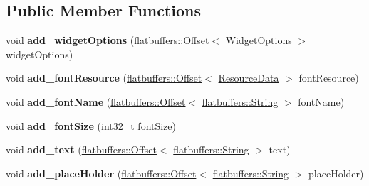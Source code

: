 \subsection*{Public Member Functions}
\begin{DoxyCompactItemize}
\item 
\mbox{\label{structflatbuffers_1_1TextFieldOptionsBuilder_aa5790c3f840f0457cc9e5c38afb6cde7}} 
void {\bfseries add\+\_\+widget\+Options} (\hyperlink{structflatbuffers_1_1Offset}{flatbuffers\+::\+Offset}$<$ \hyperlink{structflatbuffers_1_1WidgetOptions}{Widget\+Options} $>$ widget\+Options)
\item 
\mbox{\label{structflatbuffers_1_1TextFieldOptionsBuilder_a6fe9734039c2542e27a5afc471c2f88c}} 
void {\bfseries add\+\_\+font\+Resource} (\hyperlink{structflatbuffers_1_1Offset}{flatbuffers\+::\+Offset}$<$ \hyperlink{structflatbuffers_1_1ResourceData}{Resource\+Data} $>$ font\+Resource)
\item 
\mbox{\label{structflatbuffers_1_1TextFieldOptionsBuilder_a1ca077e245ef1d232badaa75caa45120}} 
void {\bfseries add\+\_\+font\+Name} (\hyperlink{structflatbuffers_1_1Offset}{flatbuffers\+::\+Offset}$<$ \hyperlink{structflatbuffers_1_1String}{flatbuffers\+::\+String} $>$ font\+Name)
\item 
\mbox{\label{structflatbuffers_1_1TextFieldOptionsBuilder_a13fcfad6b001805b5127f21e051c4278}} 
void {\bfseries add\+\_\+font\+Size} (int32\+\_\+t font\+Size)
\item 
\mbox{\label{structflatbuffers_1_1TextFieldOptionsBuilder_ad5dae53b9f2f46ff1b7297856ca777f8}} 
void {\bfseries add\+\_\+text} (\hyperlink{structflatbuffers_1_1Offset}{flatbuffers\+::\+Offset}$<$ \hyperlink{structflatbuffers_1_1String}{flatbuffers\+::\+String} $>$ text)
\item 
\mbox{\label{structflatbuffers_1_1TextFieldOptionsBuilder_a8ef2f259f89c205b6cc692ac2a4fd386}} 
void {\bfseries add\+\_\+place\+Holder} (\hyperlink{structflatbuffers_1_1Offset}{flatbuffers\+::\+Offset}$<$ \hyperlink{structflatbuffers_1_1String}{flatbuffers\+::\+String} $>$ place\+Holder)

\end{DoxyCompactItemize}
